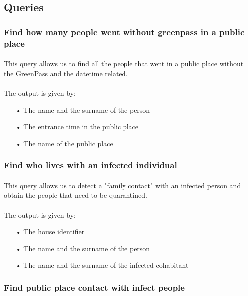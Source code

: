 \documentclass[a4paper,12pt]{article}
\begin{document}
\subsection{Queries}
\subsubsection{Find how many people went without greenpass in a public place}
\paragraph{} This query allows us to find all the people that went in a public place without the GreenPass and the datetime related.

\paragraph{} The output is given by: 
\begin{itemize}
\item[•] The name and the surname of the person
\item[•] The entrance time in the public place
\item[•] The name of the public place
\end{itemize}
\clearpage
\subsubsection{Find who lives with an infected individual}
\paragraph{} This query allows us to detect a "family contact" with an infected person and obtain the people that need to be quarantined.
\paragraph{} The output is given by: 
\begin{itemize}
\item[•] The house identifier
\item[•] The name and the surname of the person
\item[•] The name and the surname of the infected cohabitant

\end{itemize}
\subsubsection{Find public place contact with infect people}
\end{document}
